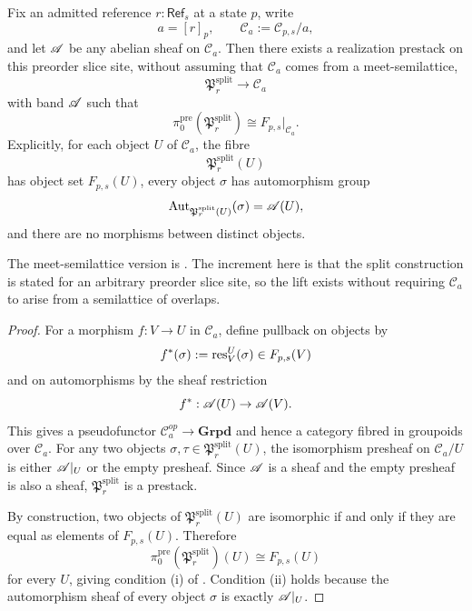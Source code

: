 \begin{proposition}\label{prop:split-realization-prestack}
Fix an admitted reference $r:\mathsf{Ref}_s$ at a state $p$, write
\[
a=[r]_p,
\qquad
\mathcal C_a:=\mathcal C_{p,s}/a,
\]
and let $\mathscr{A}$ be any abelian sheaf on $\mathcal C_a$. Then there exists a realization prestack on this preorder slice site, without assuming that $\mathcal C_a$ comes from a meet-semilattice,
\[
\mathfrak P_r^{\mathrm{split}}\to \mathcal C_a
\]
with band $\mathscr{A}$ such that
\[
\pi_0^{\mathrm{pre}}(\mathfrak P_r^{\mathrm{split}})
\cong
F_{p,s}|_{\mathcal C_a}.
\]
Explicitly, for each object $U$ of $\mathcal C_a$, the fibre
\[
\mathfrak P_r^{\mathrm{split}}(U)
\]
has object set $F_{p,s}(U)$, every object $\sigma$ has automorphism group
\[
\mathrm{Aut}_{\mathfrak P_r^{\mathrm{split}}(U)}(\sigma)=\mathscr{A}(U),
\]
and there are no morphisms between distinct objects.
\end{proposition}

\begin{remark}
The meet-semilattice version is \cite[Proposition~4.11]{MaZhang2026ConditionalGluingFailure}. The increment here is that the split construction is stated for an arbitrary preorder slice site, so the lift exists without requiring $\mathcal C_a$ to arise from a semilattice of overlaps.
\end{remark}

\begin{proof}
For a morphism $f:V\to U$ in $\mathcal C_a$, define pullback on objects by
\[
f^*(\sigma):=\mathrm{res}_V^U(\sigma)\in F_{p,s}(V)
\]
and on automorphisms by the sheaf restriction
\[
f^*:\mathscr{A}(U)\to \mathscr{A}(V).
\]
This gives a pseudofunctor $\mathcal C_a^{op}\to \mathbf{Grpd}$ and hence a category fibred in groupoids over $\mathcal C_a$. For any two objects $\sigma,\tau\in \mathfrak P_r^{\mathrm{split}}(U)$, the isomorphism presheaf on $\mathcal C_a/U$ is either $\mathscr{A}|_U$ or the empty presheaf. Since $\mathscr{A}$ is a sheaf and the empty presheaf is also a sheaf, $\mathfrak P_r^{\mathrm{split}}$ is a prestack.

By construction, two objects of $\mathfrak P_r^{\mathrm{split}}(U)$ are isomorphic if and only if they are equal as elements of $F_{p,s}(U)$. Therefore
\[
\pi_0^{\mathrm{pre}}(\mathfrak P_r^{\mathrm{split}})(U)\cong F_{p,s}(U)
\]
for every $U$, giving condition \textup{(i)} of . Condition \textup{(ii)} holds because the automorphism sheaf of every object $\sigma$ is exactly $\mathscr{A}|_U$.
\end{proof}

